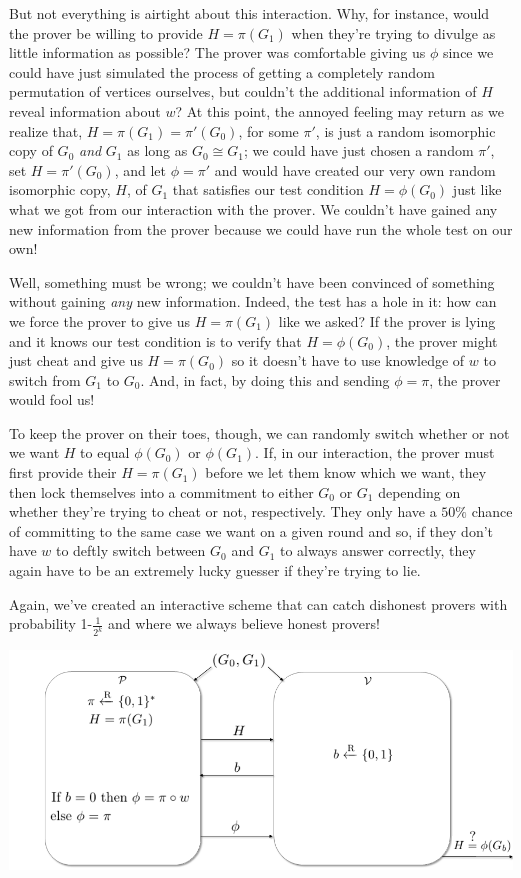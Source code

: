 		But not everything is airtight about this interaction.  Why, for instance, would the prover be willing to provide $H=\pi(G_1)$ when they're trying to divulge as little information as possible?  The prover was comfortable giving us $\phi$ since we could have just simulated the process of getting a completely random permutation of vertices ourselves, but couldn't the additional information of $H$ reveal information about $w$?  At this point, the annoyed feeling may return as we realize that, $H=\pi(G_1)=\pi'(G_0)$, for some $\pi'$, is just a random isomorphic copy of $G_0$ \textit{and} $G_1$ as long as $G_0 \cong G_1$; we could have just chosen a random $\pi'$, set $H=\pi'(G_0)$, and let $\phi=\pi'$ and would have created our very own random isomorphic copy, $H$, of $G_1$ that satisfies our test condition $H=\phi(G_0)$ just like what we got from our interaction with the prover.  We couldn't have gained any new information from the prover because we could have run the whole test on our own!
		
		Well, something must be wrong; we couldn't have been convinced of something without gaining \textit{any} new information.  Indeed, the test has a hole in it: how can we force the prover to give us $H=\pi(G_1)$ like we asked?  If the prover is lying and it knows our test condition is to verify that $H=\phi(G_0)$, the prover might just cheat and give us $H=\pi(G_0)$ so it doesn't have to use knowledge of $w$ to switch from $G_1$ to $G_0$.  And, in fact, by doing this and sending $\phi=\pi$, the prover would fool us!
		
		To keep the prover on their toes, though, we can randomly switch whether or not we want $H$ to equal $\phi(G_0)$ or $\phi(G_1)$.  If, in our interaction, the prover must first provide their $H=\pi(G_1)$ before we let them know which we want, they then lock themselves into a commitment to either $G_0$ or $G_1$ depending on whether they're trying to cheat or not, respectively.  They only have a $50\%$ chance of committing to the same case we want on a given round and so, if they don't have $w$ to deftly switch between $G_0$ and $G_1$ to always answer correctly, they again have to be an extremely lucky guesser if they're trying to lie.
		
		Again, we've created an interactive scheme that can catch dishonest provers with probability 1-$\frac{1}{2^k}$ and where we always believe honest provers!
		
		\begin{center}
			\includegraphics[scale=.51094]{GI_ZK_Protocol.png}
		\end{center}
		
